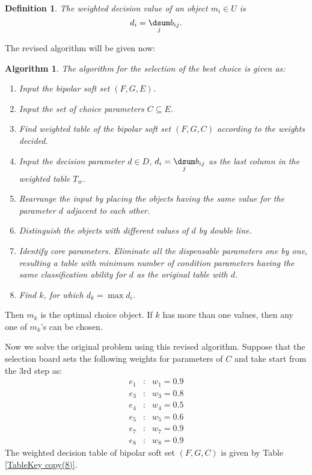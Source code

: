 \documentclass{amsart}
\theoremstyle{plain}
\newtheorem{algorithm}{Algorithm}
\newtheorem{definition}{Definition}
\numberwithin{equation}{section}
\begin{document}
\begin{definition}
The \textit{weighted decision value} of an object $m_{i}\in U$ is 
\begin{equation*}
d_{i}=\underset{j}{\dsum }b_{ij}\text{.}
\end{equation*}
\end{definition}

The revised algorithm will be given now:

\begin{algorithm}
The algorithm for the selection of the best choice is given as:

\begin{enumerate}
\item Input the bipolar soft set $(F,G,E)$.

\item Input the set of choice parameters $C\subseteq E$.

\item Find weighted table of the bipolar soft set $(F,G,C)$ according to the
weights decided.

\item Input the decision parameter $d\in D$, $d_{i}=\underset{j}{\dsum }b_{ij}$ as the last column in the weighted table $T_{w}$.

\item Rearrange the input by placing the objects having the same value for
the parameter $d$ adjacent to each other.

\item Distinguish the objects with different values of $d$ by double line.

\item Identify core parameters. Eliminate all the dispensable parameters one
by one, resulting a table with minimum number of condition parameters having
the same classification ability for $d$ as the original table with $d$.

\item Find $k$, for which $d_{k}=\max d_{i}$.
\end{enumerate}
\end{algorithm}

Then $m_{k}$ is the optimal choice object. If $k$ has more than one values,
then any one of $m_{k}$'s can be chosen.

Now we solve the original problem using this revised algorithm. Suppose that
the selection board sets the following weights for parameters of $C$ and
take start from the 3rd step as:\begin{eqnarray*}
e_{1} &:&w_{1}=0.9 \\
e_{3} &:&w_{3}=0.8 \\
e_{4} &:&w_{4}=0.5 \\
e_{5} &:&w_{5}=0.6 \\
e_{7} &:&w_{7}=0.9 \\
e_{8} &:&w_{8}=0.9
\end{eqnarray*}The weighted decision table of bipolar soft set $(F,G,C)$ is given by Table \ref{TableKey copy(8)}.
\end{document}
